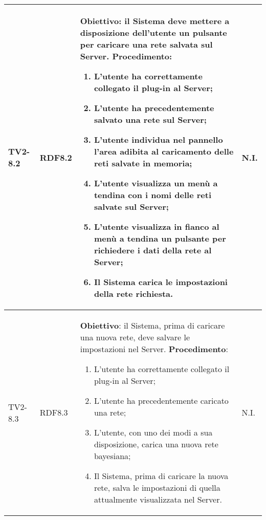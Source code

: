 \begin{longtable}{|C{.15\textwidth}|C{.13\textwidth}|m{.52\textwidth}|C{.08\textwidth}|}
TV2-8.2 & RDF8.2 &
	\textbf{Obiettivo}: il Sistema deve mettere a disposizione dell'utente un pulsante per caricare una rete salvata sul Server. \newline
	\textbf{Procedimento}:
	\begin{enumerate}
		\item L'utente ha correttamente collegato il plug-in al Server;
		\item L'utente ha precedentemente salvato una rete sul Server;
		\item L'utente individua nel pannello l'area adibita al caricamento delle reti salvate in memoria;
		\item L'utente visualizza un menù a tendina con i nomi delle reti salvate sul Server;
		\item L'utente visualizza in fianco al menù a tendina un pulsante per richiedere i dati della rete al Server;
		\item Il Sistema carica le impostazioni della rete richiesta.
	\end{enumerate}
	& N.I. \\
\hline

TV2-8.3 & RDF8.3 &
	\textbf{Obiettivo}: il Sistema, prima di caricare una nuova rete, deve salvare le impostazioni nel Server. \newline
	\textbf{Procedimento}:
	\begin{enumerate}
		\item L'utente ha correttamente collegato il plug-in al Server;
		\item L'utente ha precedentemente caricato una rete;
		\item L'utente, con uno dei modi a sua disposizione, carica una nuova rete bayesiana;
		\item Il Sistema, prima di caricare la nuova rete, salva le impostazioni di quella attualmente visualizzata nel Server.
	\end{enumerate}
	& N.I. \\
\hline	


\end{longtable}

